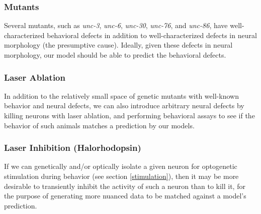 \documentclass[letter,11pt]{article}
\begin{document}
\subsubsection{Mutants}

Several mutants, such as {\em unc-3}, {\em unc-6}, {\em unc-30}, {\em unc-76}, and {\em unc-86}, have well-characterized behavioral defects
in addition to well-characterized defects in neural morphology (the presumptive cause). Ideally, given these defects in neural morphology,
our model should be able to predict the behavioral defects.

\subsubsection{Laser Ablation}

In addition to the relatively small space of genetic mutants with well-known behavior and neural defects, we can also introduce arbitrary
neural defects by killing neurons with laser ablation, and performing behavioral assays to see if the behavior of such animals matches a
prediction by our models.

\subsubsection{Laser Inhibition (Halorhodopsin)}

If we can genetically and/or optically isolate a given neuron for optogenetic
stimulation during behavior (see section \ref{stimulation}), then it may be
more desirable to transiently inhibit the activity of such a neuron than to
kill it, for the purpose of generating more nuanced data to be matched against
a model's prediction.
\end{document}

